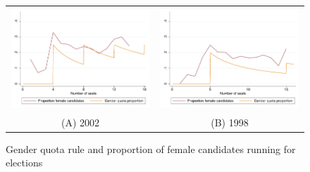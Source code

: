 \begin{figure}[]

    \begin{tabular}{cc}
        \includegraphics[width=0.5\columnwidth]{figures/firstStage_candidates_2002.pdf} & \includegraphics[width=0.5\columnwidth]{figures/firstStage_candidates_1998.pdf} \\
        (A) 2002                                                                      & (B) 1998                                                                      
    \end{tabular}

    \caption{Gender quota rule and proportion of female candidates running for elections}
    \label{fig:firstStage-candidates}
\end{figure}